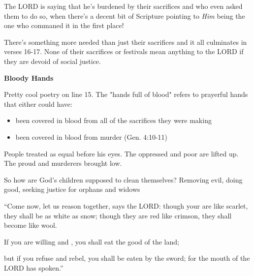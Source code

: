 \documentclass[11pt]{article}
\begin{document}
The LORD is saying that he's burdened by their sacrifices and who even asked them to do so, when there's a decent
bit of Scripture pointing to \textit{Him} being the one who commaned it in the first place!

{\vspace{1em}}
There's something more needed than just their sacrifices and it all culminates in verses 16-17. None of their sacrifices or festivals
mean anything to the LORD if they are devoid of social justice.

{\vspace{3em}}

{\large\bfseries Bloody Hands}
{\vspace{1em}}

Pretty cool poetry on line 15. The "hands full of blood" refers to prayerful hands that either could have:
\begin{itemize}
    \item been covered in blood from all of the sacrifices they were making
    \item been covered in blood from murder (Gen. 4:10-11)
\end{itemize}
{\vspace{1em}}


People treated as equal before his eyes. The oppressed and poor are lifted up. The proud and murderers brought low.

So how are God's children supposed to clean themselves? Removing evil, doing good, seeking justice for orphans and widows

\begin{biblicaloutline}[Isaiah 1:18-20]

    \begin{versesection}{2em}
 ``Come now, let us reason together, says the LORD:
\poetryline though your  are like scarlet,
\poetryline they shall be as white as snow;
though they are red like crimson,
\poetryline they shall become like wool.

 If you are willing and ,
\poetryline you shall eat the good of the land;

 but if you refuse and rebel,
\poetryline you shall be eaten by the sword;
\poetryline for the mouth of the LORD has spoken.''
    \end{versesection}

\end{biblicaloutline}
\end{document}
